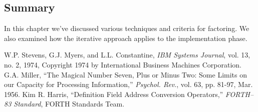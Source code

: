 \subsection{Summary}
In this chapter we've discussed various techniques and criteria for factoring. We also examined how the iterative approach applies to the implementation phase.

\begin{references}{9}
 W.P. Stevens, G.J. Myers, and L.L. Constantine,
\emph{ IBM Systems Journal}, vol. 13, no. 2, 1974, Copyright 1974 by
International Business Machines Corporation.
 G.A. Miller, ``The Magical Number Seven, Plus or
Minus Two: Some Limits on our Capacity for Processing Information,''
\emph{Psychol. Rev}., vol. 63, pp. 81-97, Mar. 1956.
 Kim R. Harris, ``Definition Field Address
Conversion Operators,'' \emph{FORTH--83 Standard}, FORTH Standards
Team.
\end{references}

